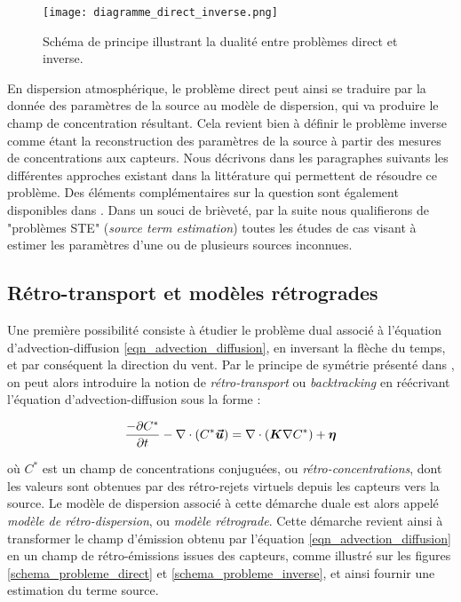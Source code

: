 	\begin{figure}
		\centering
		\texttt{[image: diagramme\_direct\_inverse.png]}
		\caption{Schéma de principe illustrant la dualité entre problèmes direct et inverse.}
		\label{fig_diagramme_direct_inverse}
	\end{figure}
	
	
	En dispersion atmosphérique, le problème direct peut ainsi se traduire par la donnée des paramètres de la source au modèle de dispersion, qui va produire le champ de concentration résultant. Cela revient bien à définir le problème inverse comme étant la reconstruction des paramètres de la source à partir des mesures de concentrations aux capteurs. Nous décrivons dans les paragraphes suivants les différentes approches existant dans la littérature qui permettent de résoudre ce problème. Des éléments complémentaires sur la question sont également disponibles dans \cite{Rao2007}. Dans un souci de brièveté, par la suite nous qualifierons de "problèmes STE" (\textit{source term estimation}) toutes les études de cas visant à estimer les paramètres d'une ou de plusieurs sources inconnues.\\
	
	
 \subsection{{Rétro-transport et modèles rétrogrades}}
 
 Une première possibilité consiste à étudier le problème dual associé à l'équation d'advection-diffusion  \eqref{eqn_advection_diffusion}, en inversant la flèche du temps, et par conséquent la direction du vent.  Par le principe de symétrie présenté dans \cite{Hourdin2006a}, on peut alors introduire la notion de \textit{rétro-transport} ou \textit{backtracking} en  réécrivant l'équation d'advection-diffusion sous la forme : 
 
 \begin{equation}
 \label{eqn_advection_diffusion_backward}
 \dfrac{-\partial C^*}{\partial t} - \nabla \cdot(C^*\bm{\vec{u}}) = \nabla \cdot (\bm{K}\nabla C^*) + {\bm{\eta}}
 \end{equation}
 
 où $C^*$ est un champ de concentrations conjuguées, ou \textit{rétro-concentrations}, dont les valeurs sont obtenues par des rétro-rejets virtuels depuis les capteurs vers la source. Le modèle de dispersion associé à cette démarche duale est alors appelé {\textit{modèle de rétro-dispersion}, ou \textit{modèle rétrograde}}. Cette démarche revient ainsi à transformer le champ d'émission {obtenu par l'équation \eqref{eqn_advection_diffusion}} en un champ de rétro-émissions issues des capteurs, comme illustré sur les figures \ref{schema_probleme_direct} et \ref{schema_probleme_inverse}, et ainsi fournir une estimation du terme source.\\
 
